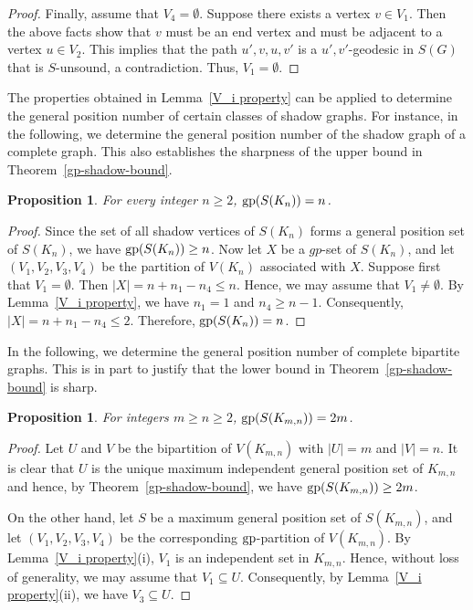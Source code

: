 \documentclass[a4paper,12pt]{article}
\newtheorem{proposition}[theorem]{Proposition}
\newcommand{\gp}{{\rm gp}}
\begin{document}
{\begin{proof}
Finally, assume that $V_4 = \emptyset$. Suppose there exists a vertex $v \in V_1$. Then the above facts show that $v$ must be an end vertex and must be adjacent to a vertex $u \in V_2$. This implies that the path $u', v, u, v'$ is a $u',v'$-geodesic in $S(G)$ that is $S$-unsound, a contradiction. Thus, $V_1 = \emptyset$.
    \end{proof} 
    The properties obtained in Lemma~\ref{V_i property} can be applied to determine the general position number of certain classes of shadow graphs. For instance, in the following, we determine the general position number of the shadow graph of a complete graph. This also establishes the sharpness of the upper bound in Theorem~\ref{gp-shadow-bound}.

    \begin{proposition}
        For every integer $n\geq 2$, $\gp(S(K_n))=n$.
    \end{proposition}
    \begin{proof} Since the set of all shadow vertices of $S(K_n)$ forms a general position set of $S(K_n)$, we have $\gp(S(K_n)) \geq n$.
 Now let $X$ be a $gp$-set of $S(K_n)$, and let $(V_1,V_2,V_3,V_4)$ be the partition of $V(K_n)$ associated with $X$. Suppose first that $V_1=\emptyset$. Then $|X| = n + n_1 - n_4 \leq n$. Hence, we may assume that $V_1 \neq \emptyset$. By Lemma~\ref{V_i property}, we have $n_1=1$ and $n_4 \geq n-1$. Consequently, $|X| = n + n_1 - n_4 \leq 2$.
Therefore, $\gp(S(K_n)) = n$.
\end{proof}

In the following, we determine the general position number of complete bipartite graphs. This is in part to justify that the lower bound in Theorem~\ref{gp-shadow-bound} is sharp.

\begin{proposition}
    For integers $m\geq n\geq 2$, $\gp(S(K_{m,n}))=2m$.
\end{proposition}
\begin{proof} Let $U$ and $V$ be the bipartition of $V(K_{m,n})$ with $|U| = m$ and $|V| = n$. It is clear that $U$ is the unique maximum independent general position set of $K_{m,n}$ and hence, by Theorem~\ref{gp-shadow-bound}, we have $\gp(S(K_{m,n})) \geq 2m$. 

On the other hand, let $S$ be a maximum general position set of $S(K_{m,n})$, and let $(V_1, V_2, V_3, V_4)$ be the corresponding $\gp$-partition of $V(K_{m,n})$. By Lemma~\ref{V_i property}(i), $V_1$ is an independent set in $K_{m,n}$. Hence, without loss of generality, we may assume that $V_1 \subseteq U$. Consequently, by Lemma~\ref{V_i property}(ii), we have $V_3 \subseteq U$. 


\end{proof}}
\end{document}
